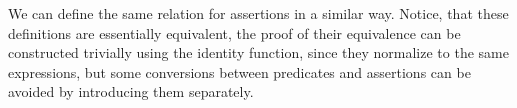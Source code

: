 We can define the same relation for assertions in a similar way. Notice, that these definitions are essentially equivalent, the proof of their equivalence can be constructed trivially using the identity function, since they normalize to the same expressions, but some conversions between predicates and assertions can be avoided by introducing them separately.

\begin{code}
    \>[2]\AgdaSpace{}%
    \AgdaSpace{}%
    \<%
    \\
    \>[2]\AgdaSpace{}%
    \AgdaSymbol{:}\AgdaSpace{}%
    \AgdaSpace{}%
    \AgdaSpace{}%
    \AgdaSpace{}%
    \AgdaSpace{}%
    \<%
    \\
    \>[2]\AgdaSpace{}%
    \AgdaSpace{}%
    \AgdaSpace{}%
    \AgdaSymbol{=}\AgdaSpace{}%
    \AgdaSpace{}%
    \AgdaSymbol{:}\AgdaSpace{}%
    \AgdaSymbol{\}}\AgdaSpace{}%
    \AgdaSpace{}%
    \AgdaSpace{}%
    \AgdaSpace{}%
    \AgdaSpace{}%
    \AgdaSpace{}%
    \AgdaSpace{}%
    \AgdaSpace{}%
    \<%
    \\
    \\[\AgdaEmptyExtraSkip]%
    \>[2]\AgdaSpace{}%
    \AgdaSpace{}%
    \<%
    \\
    \>[2]\AgdaSpace{}%
    \AgdaSymbol{:}\AgdaSpace{}%
    \AgdaSpace{}%
    \AgdaSpace{}%
    \AgdaSpace{}%
    \AgdaSpace{}%
    \<%
    \\
    \>[2]\AgdaSpace{}%
    \AgdaSpace{}%
    \AgdaSpace{}%
    \AgdaSymbol{=}\AgdaSpace{}%
    \AgdaSpace{}%
    \AgdaSpace{}%
    \<%
    \\
    \\[\AgdaEmptyExtraSkip]%

\end{code}
